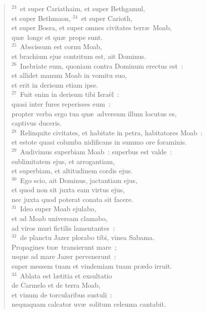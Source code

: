 \begin{flushleft}
\begin{verse}
${}^{23}$~et super Cariathaim, et super Bethgamul,\\ et super Bethmaon,
${}^{24}$~et super Carioth,\\ et super Bosra, et super omnes civitates terr\ae\ Moab,\\ qu\ae\ longe et qu\ae\ prope sunt.\\
${}^{25}$~Abscissum est cornu Moab,\\ et brachium ejus contritum est, ait Dominus.\\
${}^{26}$~Inebriate eum, quoniam contra Dominum erectus est~:\\ et allidet manum Moab in vomitu suo,\\ et erit in derisum etiam ipse.\\
${}^{27}$~Fuit enim in derisum tibi Isra\"el~:\\ quasi inter fures reperisses eum~:\\ propter verba ergo tua qu\ae\ adversum illum locutus es,\\ captivus duceris.\\
${}^{28}$~Relinquite civitates, et habitate in petra, habitatores Moab~:\\ et estote quasi columba nidificans in summo ore foraminis.\\
${}^{29}$~Audivimus superbiam Moab~: superbus est valde~:\\ sublimitatem ejus, et arrogantiam,\\ et superbiam, et altitudinem cordis ejus.\\
${}^{30}$~Ego scio, ait Dominus, jactantiam ejus,\\ et quod non sit juxta eam virtus ejus,\\ nec juxta quod poterat conata sit facere.\\
${}^{31}$~Ideo super Moab ejulabo,\\ et ad Moab universam clamabo,\\ ad viros muri fictilis lamentantes~:\\
${}^{32}$~de planctu Jazer plorabo tibi, vinea Sabama.\\ Propagines tu\ae\ transierunt mare~;\\ usque ad mare Jazer pervenerunt~:\\ super messem tuam et vindemiam tuam pr\ae do irruit.\\
${}^{33}$~Ablata est l\ae titia et exsultatio\\ de Carmelo et de terra Moab,\\ et vinum de torcularibus sustuli~:\\ nequaquam calcator uv\ae\ solitum celeuma cantabit.\\

\end{verse}
\end{flushleft}
